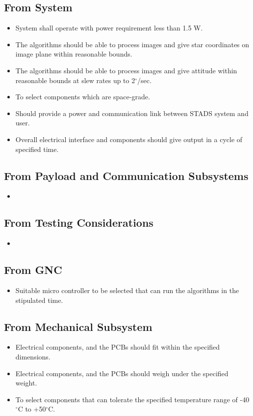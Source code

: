 \documentclass[../../main.tex]{subfiles}
\begin{document}
\subsection{From System}
\begin{itemize}
    \item System shall operate with power requirement less than 1.5 W.
    \item The algorithms should be able to process images and give star coordinates on image plane within reasonable bounds.
    \item The algorithms should be able to process images and give attitude within reasonable bounds at slew rates up to 2$^\circ$/sec.
    \item To select components which are space-grade.
    \item Should provide a power and communication link between STADS system and user.
    \item Overall electrical interface and components should give output in a cycle of specified time.
    
\end{itemize}
\subsection{From Payload and Communication Subsystems}
\begin{itemize}
    \item 
\end{itemize}
\subsection{From Testing Considerations}
\begin{itemize}
    \item 
\end{itemize}
\subsection{From GNC}
\begin{itemize}
    \item Suitable micro controller to be selected that can run the algorithms in the stipulated time.
    
\end{itemize}
\subsection{From Mechanical Subsystem}
\begin{itemize}
    \item Electrical components, and the PCBs should fit within the specified dimensions.
    \item Electrical components, and the PCBs should weigh under the specified weight.
    \item To select components that can tolerate the specified temperature range of -40$^\circ$C to +50$^\circ$C.
\end{itemize}
\end{document}
